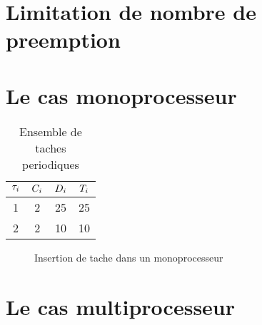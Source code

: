 \section{Limitation de nombre de preemption}
 
\section{Le cas monoprocesseur}
%

\begin{table}[!h]
\begin{center}
\begin{tabular}{|c|c|c|c|}
 \hline$\tau_{i}$ & $C_{i}$ & $D_{i}$ & $T_{i}$ \\ 
 \hline 1 & 2 & 25 & 25 \\ 
 \hline 2 & 2 & 10 & 10 \\ 
 \hline 
 \end{tabular}
\end{center}
\caption{Ensemble de taches periodiques} \label{tab:exempleedfmp}
\end{table}

\begin{figure}[h]
\begin{center}
\begin{RTGrid}[height=4cm,width=12cm,labelsize=8pt,numbersize=6]{3}{32}





\end{RTGrid}
\caption{Insertion de tache dans un monoprocesseur} \label{fig:exempleedfmp}
\end{center}
\end{figure}

\section{Le cas multiprocesseur}



